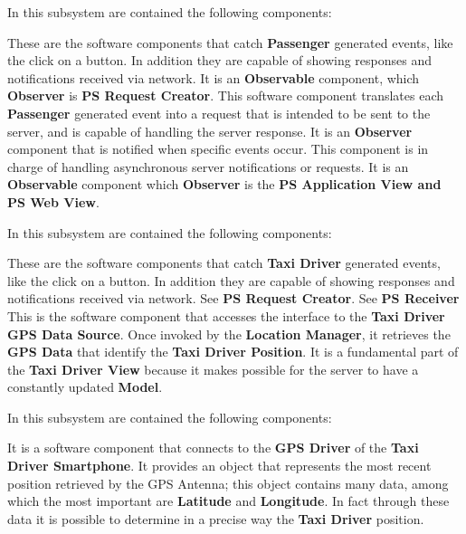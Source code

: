 \begin{itemize}
	In this subsystem are contained the following components:
	\begin{itemize}
		 These are the software components that catch \textbf{Passenger} generated events, like the click on a button. In addition they are capable of showing responses and notifications received via network.
		It is an \textbf{Observable} component, which \textbf{Observer} is \textbf{PS Request Creator}.
		 This software component translates each \textbf{Passenger} generated event into a request that is intended to be sent to the server, and is capable of handling the server response.
		It is an \textbf{Observer} component that is notified when specific events occur.
		 This component is in charge of handling asynchronous server notifications or requests.
		It is an \textbf{Observable} component which \textbf{Observer} is the \textbf{PS Application View and PS Web View}.
	\end{itemize}
	\itemBold{Taxi Driver View}
	In this subsystem are contained the following components:
	\begin{itemize}
		 These are the software components that catch \textbf{Taxi Driver} generated events, like the click on a button. In addition they are capable of showing responses and notifications received via network.
		 See \textbf{PS Request Creator}.
		 See \textbf{PS Receiver}
		 This is the software component that accesses the interface to the \textbf{Taxi Driver GPS Data Source}. Once invoked by the \textbf{Location Manager}, it retrieves the \textbf{GPS Data} that identify the \textbf{Taxi Driver Position}. It is a fundamental part of the \textbf{Taxi Driver View} because it makes possible for the server to have a constantly updated \textbf{Model}.
	\end{itemize}	
	\itemBold{Taxi Driver Model}
	In this subsystem are contained the following components:
	\begin{itemize}
		 It is a software component that connects to the \textbf{GPS Driver} of the \textbf{Taxi Driver Smartphone}.
		It provides an object that represents the most recent position retrieved by the GPS Antenna; this object contains many data, among which the most important are \textbf{Latitude} and \textbf{Longitude}.
		In fact through these data it is possible to determine in a precise way the \textbf{Taxi Driver} position.
	\end{itemize}	
	

\end{itemize}
